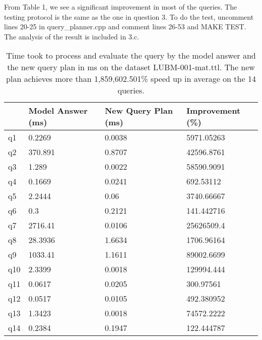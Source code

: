 \documentclass{article}
\begin{document}
\begin{enumerate}
\begin{enumerate}
\begin{algorithm}[H]
\begin{algorithmic}
\EndFor
\EndWhile

\end{algorithmic}
\end{algorithm}


From Table 1, we see a significant improvement in most of the queries. The testing protocol is the same as the one in question 3. To do the test, uncomment lines 20-25 in query\_planner.cpp and comment lines 26-53 and MAKE TEST. The analysis of the result is included in 3.c.

\begin{table}[]\centering
\begin{tabular}{|l|l|l|l|}
\hline
	& Model Answer (ms) & New Query Plan (ms) & Improvement (\%) \\ \hline
q1  & 0.2269            & 0.0038              & 5971.05263       \\ \hline
q2  & 370.891           & 0.8707              & 42596.8761       \\ \hline
q3  & 1.289             & 0.0022              & 58590.9091       \\ \hline
q4  & 0.1669            & 0.0241              & 692.53112        \\ \hline
q5  & 2.2444            & 0.06                & 3740.66667       \\ \hline
q6  & 0.3               & 0.2121              & 141.442716       \\ \hline
q7  & 2716.41           & 0.0106              & 25626509.4       \\ \hline
q8  & 28.3936           & 1.6634              & 1706.96164       \\ \hline
q9  & 1033.41           & 1.1611              & 89002.6699       \\ \hline
q10 & 2.3399            & 0.0018              & 129994.444       \\ \hline
q11 & 0.0617            & 0.0205              & 300.97561        \\ \hline
q12 & 0.0517            & 0.0105              & 492.380952       \\ \hline
q13 & 1.3423            & 0.0018              & 74572.2222       \\ \hline
q14 & 0.2384            & 0.1947              & 122.444787       \\ \hline
\end{tabular}
\caption{Time took to process and evaluate the query by the model answer and the new query plan in ms on the dataset LUBM-001-mat.ttl. The new plan achieves more than 1,859,602.501\% speed up in average on the 14 queries.}
\end{table}


\end{enumerate}
\end{enumerate}
\end{document}

